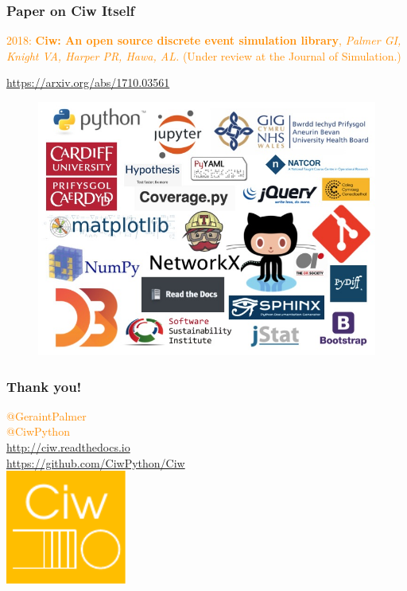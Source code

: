 \documentclass{beamer}
\begin{document}
\begin{frame}
\frametitle{Paper on Ciw Itself}
\textcolor{darkorange}{2018: \textbf{Ciw: An open source discrete event simulation library}, \textit{Palmer GI, Knight VA, Harper PR, Hawa, AL.} (Under review at the Journal of Simulation.)}
\vfill
\begin{center}
\url{https://arxiv.org/abs/1710.03561}
\end{center}
\end{frame}

\begin{frame}[plain]
\begin{figure}
    \includegraphics[width=\textwidth]{alllogos}
\end{figure}
\end{frame}

\begin{frame}
\frametitle{Thank you!}
\begin{center}
\textcolor{darkorange}{@GeraintPalmer}\\
\textcolor{darkorange}{@CiwPython}\\
\textcolor{darkorange}{\url{http://ciw.readthedocs.io}}\\
\textcolor{darkorange}{\url{https://github.com/CiwPython/Ciw}}\\
\vfill
\includegraphics[width=0.3\textwidth]{logos/ciw_logo.pdf}
\end{center}
\end{frame}
\end{document}
